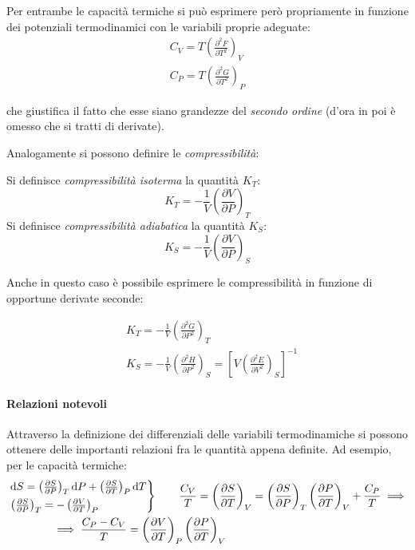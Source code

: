 Per entrambe le capacità termiche si può esprimere però propriamente in funzione dei potenziali termodinamici con le variabili proprie adeguate:
\begin{align*}
C_V = T \left(\frac{\partial^2 F}{\partial T^2}\right)_V\\
C_P = T \left(\frac{\partial^2 G}{\partial T^2}\right)_P
\end{align*}

\noindent che giustifica il fatto che esse siano grandezze del \textit{secondo ordine} (d'ora in poi è omesso che si tratti di derivate).

Analogamente si possono definire le \textit{compressibilità}:

\begin{defn}[Compressibilità]
	Si definisce \textit{compressibilità isoterma} la quantità $K_T$:
	\begin{equation*}
	K_T = - \frac{1}{V} \left(\frac{\partial V}{\partial P}\right)_T
	\end{equation*}
	Si definisce \textit{compressibilità adiabatica} la quantità $K_S$:
	\begin{equation*}
	K_S = - \frac{1}{V} \left(\frac{\partial V}{\partial P}\right)_S
	\end{equation*}
\end{defn}

Anche in questo caso è possibile esprimere le compressibilità in funzione di opportune derivate seconde:

\begin{align*}
&K_T = - \frac{1}{V} \left(\frac{\partial^2 G}{\partial P^2}\right)_T\\
&K_S = - \frac{1}{V} \left(\frac{\partial^2 H}{\partial P^2}\right)_S = \left[ V \left(\frac{\partial^2 E}{\partial V^2}\right)_S \right]^{-1}
\end{align*}

\paragraph{Relazioni notevoli} Attraverso la definizione dei differenziali delle variabili termodinamiche si possono ottenere delle importanti relazioni fra le quantità appena definite.
Ad esempio, per le capacità termiche:
\begin{align*}
&\begin{rcases*}
\dd S = \left(\frac{\partial S}{\partial P}\right)_T \dd P + \left(\frac{\partial S}{\partial T}\right)_P \dd T\\
\left(\frac{\partial S}{\partial P}\right)_T = - \left(\frac{\partial V}{\partial T}\right)_P
\end{rcases*}
\qquad \frac{C_V}{T} = \left(\frac{\partial S}{\partial T}\right)_V = \left(\frac{\partial S}{\partial P}\right)_T \left(\frac{\partial P}{\partial T}\right)_V + \frac{C_P}{T} \implies\\
&\qquad \qquad \implies \frac{C_P - C_V}{T} = \left(\frac{\partial V}{\partial T}\right)_P \left(\frac{\partial P}{\partial T}\right)_V
\end{align*}

